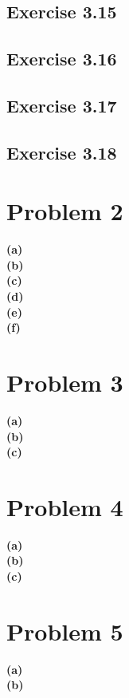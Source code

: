 \documentclass{article}
\begin{document}
\begin{adjustwidth}{-2cm}{-2cm}
\subsection{Exercise 3.15}

\subsection{Exercise 3.16}
\subsection{Exercise 3.17}
\subsection{Exercise 3.18}

\section{Problem 2}
\textbf{(a)}\\
\textbf{(b)}\\
\textbf{(c)}\\
\textbf{(d)}\\
\textbf{(e)}\\
\textbf{(f)}\\

\section{Problem 3}
\textbf{(a)}\\
\textbf{(b)}\\
\textbf{(c)}\\

\section{Problem 4}
\textbf{(a)}\\
\textbf{(b)}\\
\textbf{(c)}\\

\section{Problem 5}
\textbf{(a)}\\
\textbf{(b)}\\

\end{adjustwidth}
\end{document}
